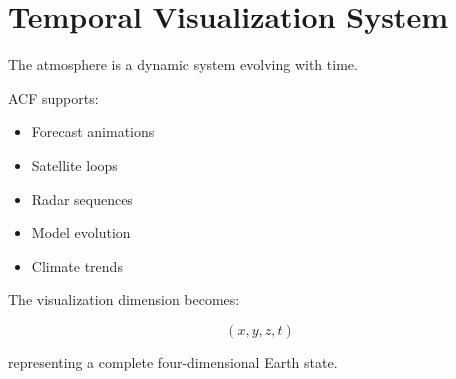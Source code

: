 \section{Temporal Visualization System}


The atmosphere is a dynamic system evolving with time.



ACF supports:


\begin{itemize}

\item Forecast animations

\item Satellite loops

\item Radar sequences

\item Model evolution

\item Climate trends

\end{itemize}



The visualization dimension becomes:


\[
(x,y,z,t)
\]


representing a complete four-dimensional Earth state.
